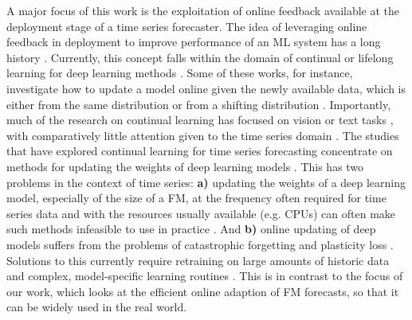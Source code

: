 A major focus of this work is the exploitation of online feedback available at the deployment stage of a time series forecaster. The idea of leveraging online feedback in deployment to improve performance of an ML system has a long history \citep{hoi2021online, polikar2001learn++, bottou2003large}. Currently, this concept falls within the domain of continual or lifelong learning for deep learning methods \citep{de2021continual, wang2024comprehensive}. Some of these works, for instance, investigate how to update a model online given the newly available data, which is either from the same distribution or from a shifting distribution \citep{aljundi2019task, lee2024chunking}. Importantly, much of the research on continual learning has focused on vision or text tasks \citep{qu2021recent, wu2024continual}, with comparatively little attention given to the time series domain \citep{besnard2024continual}. The studies that have explored continual learning for time series forecasting concentrate on methods for updating the weights of deep learning models \citep{ao2023continual, pham2022learning, zhang2024addressing}. This has two problems in the context of time series: \textbf{a)} updating the weights of a deep learning model, especially of the size of a FM, at the frequency often required for time series data and with the resources usually available (e.g. CPUs) can often make such methods infeasible to use in practice \cite{diao2024forecasting, Ekambaram2024Tiny}. And \textbf{b)} online updating of deep models suffers from the problems of catastrophic forgetting and plasticity loss \citep{kirkpatrick2017overcoming, dohare2023maintaining, de2021continual}. Solutions to this currently require retraining on large amounts of historic data and complex, model-specific learning routines \citep{yang2024recent}. This is in contrast to the focus of our work, which looks at the efficient online adaption of FM forecasts, so that it can be widely used in the real world.